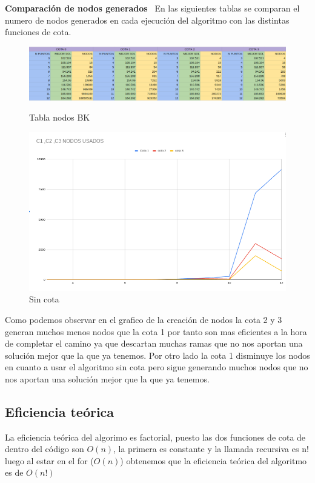 \documentclass[11pt,openany]{book}
\begin{document}
\textbf{Comparación de nodos generados} \
En las siguientes tablas se comparan el numero de nodos generados en cada ejecución del algoritmo con las distintas funciones de cota.
\begin{figure}[H]
    \centering
    \begin{minipage}{.48\textwidth}
        \centering
        \includegraphics[width=1\linewidth]{assets/Img/tablanodosbk.png}
        \caption{Tabla nodos BK}
        \label{Tabla nodos BK}
  \end{minipage}%
    \begin{minipage}{.48\textwidth}
        \centering
        \includegraphics[width=1\linewidth]{assets/Img/graficonodos.png}
        \caption{Sin cota}
        \label{Tabla nodos BK}
  \end{minipage}%
\end{figure}
Como podemos observar en el grafico de la creación de nodos la cota 2 y 3 generan muchos menos nodos que la cota 1 por tanto son mas eficientes 
a la hora de completar el camino ya que descartan muchas ramas que no nos aportan una solución mejor que la que ya tenemos.
Por otro lado la cota 1 disminuye los nodos en cuanto a usar el algoritmo sin cota pero sigue generando muchos nodos que no nos aportan una solución mejor que la que ya tenemos.
\subsection{Eficiencia teórica}
La eficiencia teórica del algorimo es factorial, puesto las dos funciones de cota de dentro del código son $O(n)$, la primera es constante y la llamada recursiva es n! luego al estar en el for ($O(n)$)
obtenemos que la eficiencia teórica del algoritmo es de $O(n!)$
\end{document}
